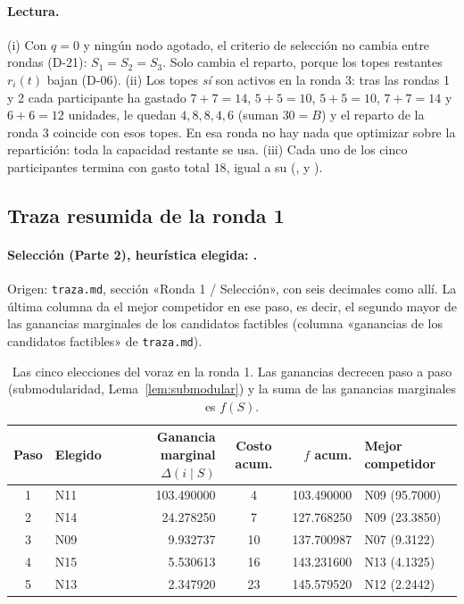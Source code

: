 \paragraph{Lectura.} (i) Con $q=0$ y ningún nodo agotado, el criterio de selección no cambia entre rondas (D-21): $S_1=S_2=S_3$. Solo cambia el reparto, porque los topes restantes $r_i(t)$ bajan (D-06). (ii) Los topes \emph{sí} son activos en la ronda 3: tras las rondas 1 y 2 cada participante ha gastado $7+7=14$, $5+5=10$, $5+5=10$, $7+7=14$ y $6+6=12$ unidades, le quedan $4,8,8,4,6$ (suman $30=B$) y el reparto de la ronda 3 coincide con esos topes. En esa ronda no hay nada que optimizar sobre la repartición: toda la capacidad restante se usa. (iii) Cada uno de los cinco participantes termina con gasto total $18$, igual a su  (,  y ).

\subsection{Traza resumida de la ronda 1}

\paragraph{Selección (Parte 2), heurística elegida: .} Origen: \texttt{traza.md}, sección «Ronda 1 / Selección», con seis decimales como allí. La última columna da el mejor competidor en ese paso, es decir, el segundo mayor de las ganancias marginales de los candidatos factibles (columna «ganancias de los candidatos factibles» de \texttt{traza.md}).

\begin{table}[h]
\centering
\small
\begin{tabular}{@{}c l r c r l@{}}
\toprule
Paso & Elegido & Ganancia marginal $\Delta(i\mid S)$ & Costo acum. & $f$ acum. & Mejor competidor\\
\midrule
1 & N11 & 103.490000 & 4  & 103.490000 & N09 (95.7000)\\
2 & N14 & 24.278250  & 7  & 127.768250 & N09 (23.3850)\\
3 & N09 & 9.932737   & 10 & 137.700987 & N07 (9.3122)\\
4 & N15 & 5.530613   & 16 & 143.231600 & N13 (4.1325)\\
5 & N13 & 2.347920   & 23 & 145.579520 & N12 (2.2442)\\
\bottomrule
\end{tabular}
\caption{Las cinco elecciones del voraz en la ronda 1. Las ganancias decrecen paso a paso (submodularidad, Lema~\ref{lem:submodular}) y la suma de las ganancias marginales es $f(S)$.}\label{tab:traza-sel}
\end{table}

